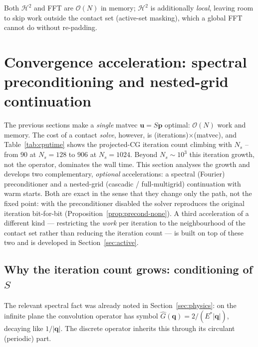 \documentclass[11pt,a4paper]{article}
\newcommand{\Es}{E^{*}}
\newcommand{\Order}{\mathcal{O}}
\newcommand{\abs}[1]{\left\lvert #1 \right\rvert}
\newcommand{\pp}{\mathbf{p}}
\newcommand{\Htwo}{\mathcal{H}^2}
\theoremstyle{definition}
\theoremstyle{remark}
\begin{document}
Both $\Htwo$ and FFT are $\Order(N)$ in memory; $\Htwo$ is additionally
\emph{local}, leaving room to skip work outside the contact set (active-set
masking), which a global FFT cannot do without re-padding.

\section{Convergence acceleration: spectral preconditioning and nested-grid continuation}
\label{sec:accel}

The previous sections make a \emph{single} matvec $\mathbf u=S\pp$ optimal:
$\Order(N)$ work and memory. The cost of a contact \emph{solve}, however, is
(iterations)$\times$(matvec), and Table~\ref{tab:cputime} shows the
projected-CG iteration count climbing with $N_s$ -- from $90$ at $N_s=128$ to
$906$ at $N_s=1024$. Beyond $N_s\sim10^3$ this iteration growth, not the
operator, dominates the wall time. This section analyses the growth and develops
two complementary, \emph{optional} accelerations: a spectral (Fourier)
preconditioner and a nested-grid (cascadic / full-multigrid) continuation with
warm starts. Both are exact in the sense that they change only the path, not the
fixed point: with the preconditioner disabled the solver reproduces the original
iteration bit-for-bit (Proposition~\ref{prop:precond-none}). A third
acceleration of a different kind --- restricting the \emph{work} per iteration
to the neighbourhood of the contact set rather than reducing the iteration
count --- is built on top of these two and is developed in
Section~\ref{sec:active}.

\subsection{Why the iteration count grows: conditioning of $S$}
\label{sec:cond}

The relevant spectral fact was already noted in Section~\ref{sec:physics}: on the
infinite plane the convolution operator has symbol
$\widehat G(\mathbf q)=2/(\Es\abs{\mathbf q})$, decaying like $1/\abs{\mathbf q}$.
The discrete operator inherits this through its circulant (periodic) part.
\end{document}
